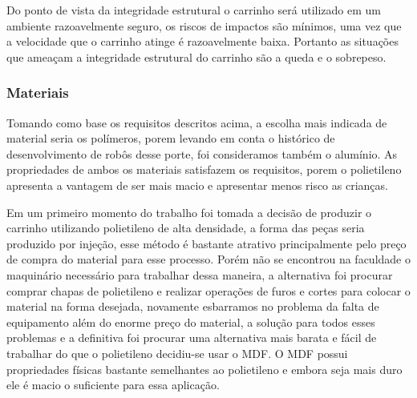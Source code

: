 Do ponto de vista da integridade estrutural o carrinho será utilizado em um ambiente razoavelmente seguro, os riscos
de impactos são mínimos, uma vez que a velocidade que o carrinho atinge é razoavelmente baixa. Portanto as situações que
ameaçam a integridade estrutural do carrinho são a queda e o sobrepeso.

\subsubsection{Materiais}

Tomando como base os requisitos descritos acima, a escolha mais indicada de material seria os polímeros, porem levando em
conta o histórico de desenvolvimento de robôs desse porte, foi consideramos também o alumínio. As propriedades de ambos os materiais
satisfazem os requisitos, porem o polietileno apresenta a vantagem de ser mais macio e apresentar menos risco as crianças.

Em um primeiro momento do trabalho foi tomada a decisão de produzir o carrinho utilizando polietileno de alta densidade, a
forma das peças seria produzido por injeção, esse método é bastante atrativo principalmente pelo preço de compra do material
para esse processo. Porém não se encontrou na faculdade o maquinário necessário para trabalhar dessa maneira, a alternativa foi
procurar comprar chapas de polietileno e realizar operações de furos e cortes para colocar o material na forma desejada, novamente
esbarramos no problema da falta de equipamento além do enorme preço do material, a solução para todos esses problemas e a
definitiva foi procurar uma alternativa mais barata e fácil de trabalhar do que o polietileno decidiu-se usar o MDF. O MDF
possui propriedades físicas bastante semelhantes ao polietileno e embora seja mais duro ele é macio o suficiente para essa aplicação.


